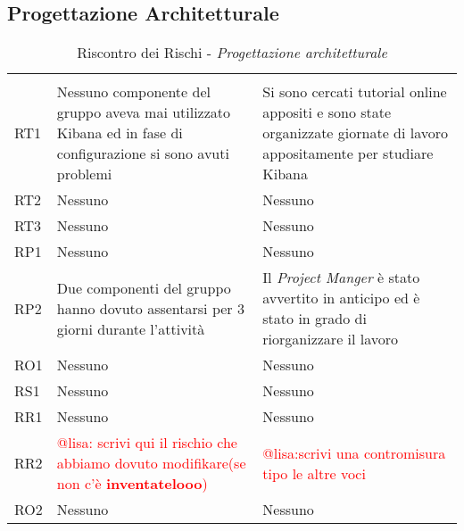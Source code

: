 \subsection{Progettazione Architetturale}
\begin{table}[H]
	\centering
	\begin{tabular}{|C{2.5cm}|C{5cm}|C{5cm}|}
		 & & \\
		RT1  & Nessuno componente del gruppo aveva mai utilizzato Kibana ed in fase di configurazione si sono avuti problemi & Si sono cercati tutorial online appositi e sono state organizzate giornate di lavoro appositamente per studiare Kibana \\
		\hline
		RT2  & Nessuno & Nessuno \\
		\hline
		RT3  & Nessuno & Nessuno \\
		\hline
		RP1  & Nessuno & Nessuno \\
		\hline
		RP2  & Due componenti del gruppo hanno dovuto assentarsi per 3 giorni durante l'attività & Il \textit{Project Manger} è stato avvertito in anticipo ed è stato in grado di riorganizzare il lavoro \\
		\hline
		RO1  & Nessuno & Nessuno \\
		\hline
		RS1  & Nessuno & Nessuno \\
		\hline
		RR1  & Nessuno & Nessuno \\
		\hline
		RR2  & \textcolor{red}{@lisa: scrivi qui il rischio che abbiamo dovuto modifikare(se non c'è  \textbf{inventatelooo})} & \textcolor{red}{@lisa:scrivi una contromisura tipo le altre voci} \\
		\hline
		RO2  & Nessuno & Nessuno \\
		\hline
	\end{tabular}
	\caption{Riscontro dei Rischi - \textit{Progettazione architetturale}}
\end{table}